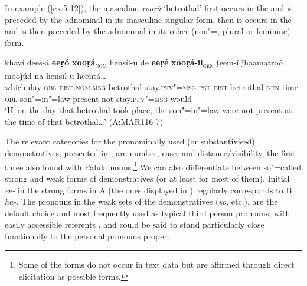 In example (\ref{ex:5-12}), the masculine  \textit{xooṛá} `betrothal' first occurs in the  and is preceded by the adnominal  in its masculine singular  form, then it occurs in the  and is then preceded by the adnominal  in its other (non"=, plural or feminine) form.

\ea
\label{ex:5-12}
\gll khayí dees-á {\ob}\textbf{eeṛó} \textbf{xooṛá}{\cb}\textsc{\textsubscript{\upshape nom}}  hensíl-u de {\ob}\textbf{eeṛé} \textbf{xooṛá-ii}{\cb}\textsc{\textsubscript{\upshape gen}} ṭeem-í ǰhaamatroó mooǰúd na hensíl-u
heentá{\dots} \\
which day-\textsc{obl} \textsc{dist.nom.msg} betrothal stay.\textsc{pfv"=msg} \textsc{pst}
\textsc{dist} betrothal-\textsc{gen} time-\textsc{obl} son"=in"=law present not stay.\textsc{pfv"=msg} would\\
\glt `If, on the day that betrothal took place, the son"=in"=law were not present at the time of that betrothal{\ldots}' (A:MAR116-7)
\z

The relevant categories for the pronominally used (or substantivised) demonstratives, presented in
, are number, case,  and distance/visibility, the first three also found with Palula nouns.\footnote{Some of the forms do not occur in text data but are affirmed through direct elicitation as possible forms.} We can also differentiate between so"=called strong and weak forms of demonstratives (or at least for most of them). Initial \textit{ee-} in the strong forms in A (the ones displayed in ) regularly corresponds to B \textit{ha-}. The pronouns in the weak  sets of the demonstratives (\textit{so}, etc.), are the default choice and most frequently used as typical third person pronouns, with easily accessible  referents \citep[432--433]{diessel2006}, and could be said to stand particularly close functionally to the personal pronouns proper. 


